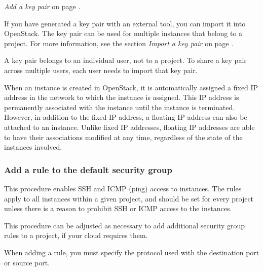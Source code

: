 {\emph{Add a key pair} on page \pageref{add-a-key-pair}.

If you have generated a key pair with an external tool, you can import
it into \gls{OpenStack}. The key pair can be used for multiple instances that
belong to a project. For more information, see the section
{\emph{Import a key pair}} on page \pageref{import-a-key-pair}.

 A key pair belongs to an individual user, not to a
project. To share a key pair across multiple users, each user needs to
import that key pair.

When an instance is created in \gls{OpenStack}, it is automatically assigned a
fixed IP address in the network to which the instance is assigned. This
IP address is permanently associated with the instance until the
instance is terminated. However, in addition to the fixed IP address, a
floating IP address can also be attached to an instance. Unlike fixed IP
addresses, floating IP addresses are able to have their associations
modified at any time, regardless of the state of the instances involved.

\subsubsection{Add a rule to the default security group}\label{add-a-rule-to-the-default-security-group}

This procedure enables SSH and ICMP (ping) access to instances. The
rules apply to all instances within a given project, and should be set
for every project unless there is a reason to prohibit SSH or ICMP
access to the instances.

This procedure can be adjusted as necessary to add additional security
group rules to a project, if your cloud requires them.

 When adding a rule, you must specify the protocol used
with the destination port or source port.

}
